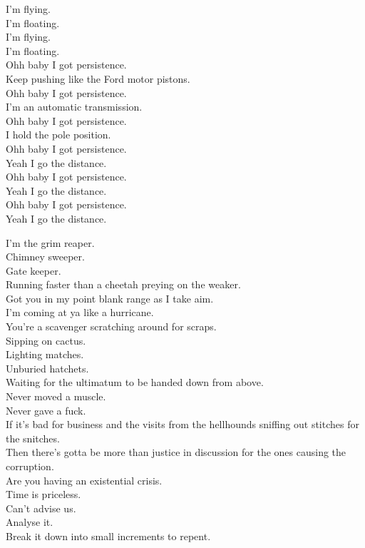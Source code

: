 I'm flying. \\
I'm floating. \\
I'm flying. \\
I'm floating. \\

Ohh baby I got persistence. \\
Keep pushing like the Ford motor pistons. \\
Ohh baby I got persistence. \\
I'm an automatic transmission. \\
Ohh baby I got persistence. \\
I hold the pole position. \\
Ohh baby I got persistence. \\
Yeah I go the distance. \\
Ohh baby I got persistence. \\
Yeah I go the distance. \\
Ohh baby I got persistence. \\
Yeah I go the distance. \\




I'm the grim reaper. \\
Chimney sweeper. \\
Gate keeper. \\
Running faster than a cheetah preying on the weaker. \\
Got you in my point blank range as I take aim. \\
I'm coming at ya like a hurricane. \\
You're a scavenger scratching around for scraps. \\
Sipping on cactus. \\
Lighting matches. \\
Unburied hatchets. \\
Waiting for the ultimatum to be handed down from above. \\
Never moved a muscle. \\
Never gave a fuck. \\

If it's bad for business and the visits from the hellhounds sniffing out stitches for the snitches. \\
Then there's gotta be more than justice in discussion for the ones causing the corruption. \\
Are you having an existential crisis. \\
Time is priceless. \\
Can't advise us. \\
Analyse it. \\
Break it down into small increments to repent. \\

